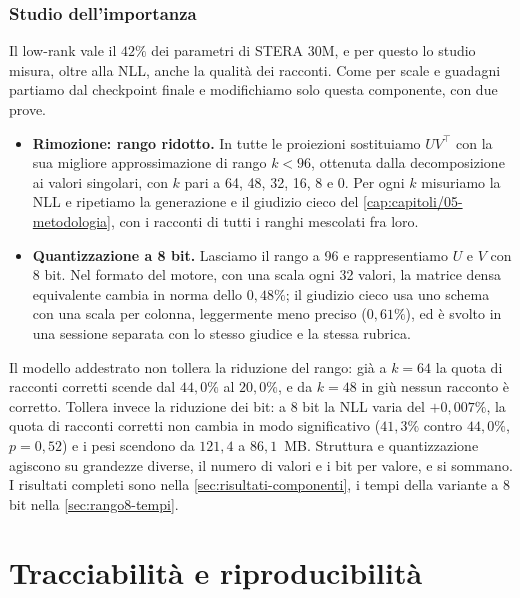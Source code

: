\subsubsection{Studio dell'importanza}
\label{sec:studio-basso-rango}
Il low-rank vale il $42\%$ dei parametri di STERA 30M, e per questo lo studio misura, oltre alla NLL, anche la qualità dei racconti. Come per scale e guadagni partiamo dal checkpoint finale e modifichiamo solo questa componente, con due prove.
\begin{itemize}
\item \textbf{Rimozione: rango ridotto.} In tutte le proiezioni sostituiamo $UV^\top$ con la sua migliore approssimazione di rango $k<96$, ottenuta dalla decomposizione ai valori singolari, con $k$ pari a 64, 48, 32, 16, 8 e 0. Per ogni $k$ misuriamo la NLL e ripetiamo la generazione e il giudizio cieco del \autoref{cap:capitoli/05-metodologia}, con i racconti di tutti i ranghi mescolati fra loro.
\item \textbf{Quantizzazione a 8 bit.} Lasciamo il rango a 96 e rappresentiamo $U$ e $V$ con 8 bit. Nel formato del motore, con una scala ogni 32 valori, la matrice densa equivalente cambia in norma dello $0{,}48\%$; il giudizio cieco usa uno schema con una scala per colonna, leggermente meno preciso ($0{,}61\%$), ed è svolto in una sessione separata con lo stesso giudice e la stessa rubrica.
\end{itemize}
Il modello addestrato non tollera la riduzione del rango: già a $k=64$ la quota di racconti corretti scende dal $44{,}0\%$ al $20{,}0\%$, e da $k=48$ in giù nessun racconto è corretto. Tollera invece la riduzione dei bit: a 8 bit la NLL varia del $+0{,}007\%$, la quota di racconti corretti non cambia in modo significativo ($41{,}3\%$ contro $44{,}0\%$, $p=0{,}52$) e i pesi scendono da $121{,}4$ a $86{,}1$~MB. Struttura e quantizzazione agiscono su grandezze diverse, il numero di valori e i bit per valore, e si sommano. I risultati completi sono nella \autoref{sec:risultati-componenti}, i tempi della variante a 8 bit nella \autoref{sec:rango8-tempi}.

\section{Tracciabilità e riproducibilità}
\label{sec:riproducibilita-stera30m}

